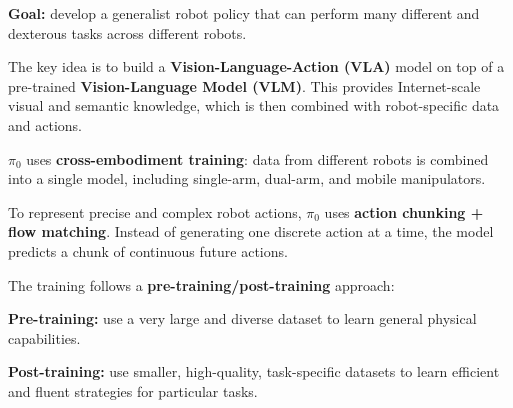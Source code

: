 \begin{dashlist}

\item \textbf{Goal:} develop a generalist robot policy that can perform many different and dexterous tasks across different robots. 

\item The key idea is to build a \textbf{Vision-Language-Action (VLA)} model on top of a pre-trained \textbf{Vision-Language Model (VLM)}. This provides Internet-scale visual and semantic knowledge, which is then combined with robot-specific data and actions.

\item $\pi_0$ uses \textbf{cross-embodiment training}: data from different robots is combined into a single model, including single-arm, dual-arm, and mobile manipulators. 

\item To represent precise and complex robot actions, $\pi_0$ uses \textbf{action chunking + flow matching}. Instead of generating one discrete action at a time, the model predicts a chunk of continuous future actions. 

\item The training follows a \textbf{pre-training/post-training} approach:
\begin{dashlist}
    \item \textbf{Pre-training:} use a very large and diverse dataset to learn general physical capabilities.
    \item \textbf{Post-training:} use smaller, high-quality, task-specific datasets to learn efficient and fluent strategies for particular tasks.
\end{dashlist}


\end{dashlist}

